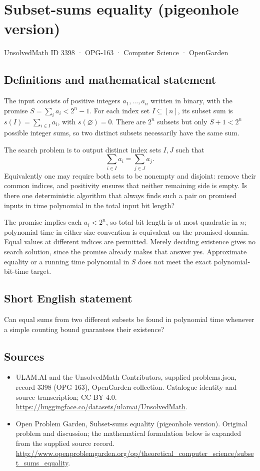 \documentclass[11pt,a4paper]{article}
\begin{document}
\section*{Subset-sums equality (pigeonhole version)}\label{3398}
{\small UnsolvedMath ID 3398 · OPG-163 · Computer Science · OpenGarden}
\subsection{Definitions and mathematical statement}
The input consists of positive integers $a_1,\ldots,a_n$ written in
binary, with the promise
$S=\sum_i a_i<2^n-1$. For each index set $I\subseteq[n]$, its subset
sum is $s(I)=\sum_{i\in I}a_i$, with $s(\varnothing)=0$.
There are $2^n$ subsets but only $S+1<2^n$ possible integer sums,
so two distinct subsets necessarily have the same sum.

The search problem is to output distinct index sets $I,J$ such that
\[
                         \sum_{i\in I}a_i=\sum_{j\in J}a_j.
\]
Equivalently one may require both sets to be nonempty and disjoint:
remove their common indices, and positivity ensures that neither
remaining side is empty. Is there one deterministic algorithm that
always finds such a pair on promised inputs in time polynomial in
the total input bit length?

The promise implies each $a_i<2^n$, so total bit length is at most
quadratic in $n$; polynomial time in either size convention is
equivalent on the promised domain. Equal values at different indices
are permitted. Merely deciding existence gives no search solution,
since the promise already makes that answer yes. Approximate
equality or a running time polynomial in $S$ does not meet the
exact polynomial-bit-time target.
\subsection{Short English statement}
Can equal sums from two different subsets be found in polynomial time whenever a simple counting bound guarantees their existence?
\subsection{Sources}
\begin{itemize}
\item[S1] ULAM.AI and the UnsolvedMath Contributors, supplied problems.json, record 3398 (OPG-163), OpenGarden collection. Catalogue identity and source transcription; CC BY 4.0.
\url{https://huggingface.co/datasets/ulamai/UnsolvedMath}.
\item[S2] Open Problem Garden, Subset-sums equality (pigeonhole version). Original problem and discussion; the mathematical formulation below is expanded from the supplied source record.
\url{http://www.openproblemgarden.org/op/theoretical_computer_science/subset_sums_equality}.
\end{itemize}
\end{document}
